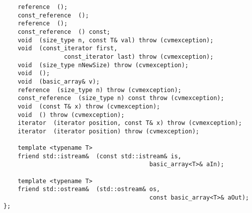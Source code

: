 \verb"    reference "\verb" ();"\\
\verb"    const_reference "\verb" ();"\\
\verb"    reference "\verb" ();"\\
\verb"    const_reference "\verb" () const;"\\
\verb"    void "\verb" (size_type n, const T& val) throw (cvmexception);"\\
\verb"    void "\verb" (const_iterator first,"\\
\verb"                 const_iterator last) throw (cvmexception);"\\
\verb"    void "\verb" (size_type nNewSize) throw (cvmexception);"\\
\verb"    void "\verb" ();"\\
\verb"    void "\verb" (basic_array& v);"\\
\verb"    reference "\verb" (size_type n) throw (cvmexception);"\\
\verb"    const_reference "\verb" (size_type n) const throw (cvmexception);"\\
\verb"    void "\verb" (const T& x) throw (cvmexception);"\\
\verb"    void "\verb" () throw (cvmexception);"\\
\verb"    iterator "\verb" (iterator position, const T& x) throw (cvmexception);"\\
\verb"    iterator "\verb" (iterator position) throw (cvmexception);"\\
\verb" "\\
\verb"    template <typename T>"\\
\verb"    friend std::istream& "\verb" (const std::istream& is,"\\
\verb"                                         basic_array<T>& aIn);"\\
\verb" "\\
\verb"    template <typename T>"\\
\verb"    friend std::ostream& "\verb" (std::ostream& os,"\\
\verb"                                         const basic_array<T>& aOut);"\\
\verb"};"
\newpage


